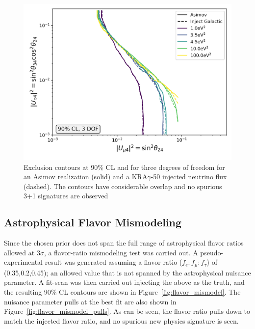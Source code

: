 \documentclass[main.tex]{subfiles}
\begin{document}
\begin{figure}
    \centering
    \includegraphics[width=0.7\linewidth]{figures/double_galactic_mismodel_fix_Realization_galactic_focus_sterile_0_cl0.9_dof3.png}
    \caption{Exclusion contours at 90\% CL and for three degrees of freedom for an Asimov realization (solid) and a KRA$\gamma$-50 injected neutrino flux (dashed). The contours have considerable overlap and no spurious 3+1 signatures are observed}\label{fig:galaxy}
\end{figure}

\subsection{Astrophysical Flavor Mismodeling}

Since the chosen prior does not span the full range of astrophysical flavor ratios allowed at $3\sigma$, a flavor-ratio mismodeling test was carried out.
A pseudo-experimental result was generated assuming a flavor ratio ($f_{e}:f_{\mu}:f_{\tau}$) of (0.35,0.2,0.45); an allowed value that is not spanned by the astrophysical nuisance parameter. 
A fit-scan was then carried out injecting the above as the truth, and the resulting 90\% CL contours are shown in Figure~\ref{fig:flavor_mismodel}. The nuisance parameter pulls at the best fit are also shown in Figure~\ref{fig:flavor_mismodel_pulls}.
As can be seen, the flavor ratio pulls down to match the injected flavor ratio, and no spurious new physics signature is seen. 
\end{document}
